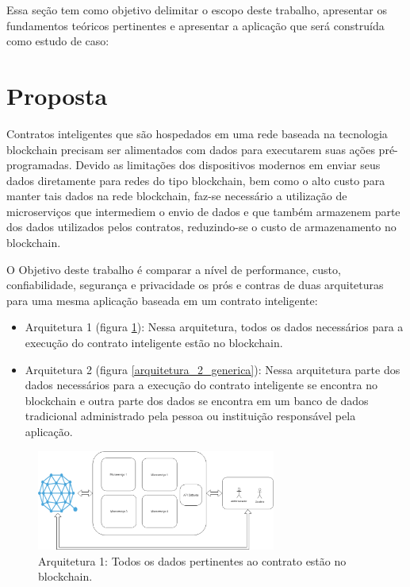 Essa seção tem como objetivo delimitar o escopo deste trabalho, apresentar os fundamentos teóricos pertinentes e apresentar a aplicação que será construída como estudo de caso:

\section{Proposta}

Contratos inteligentes que são hospedados em uma rede baseada na tecnologia blockchain precisam ser alimentados com dados para executarem suas ações pré-programadas. Devido as limitações dos dispositivos modernos em enviar seus dados diretamente para redes do tipo blockchain, bem como o alto custo para manter tais dados na rede blockchain, faz-se necessário a utilização de microserviços que intermediem o envio de dados e que também armazenem parte dos dados utilizados pelos contratos, reduzindo-se o custo de armazenamento no blockchain.

O Objetivo deste trabalho é comparar a nível de performance, custo, confiabilidade, segurança e privacidade os prós e contras de duas arquiteturas para uma mesma aplicação baseada em um contrato inteligente:

\begin{itemize}
\item Arquitetura 1 (figura \ref{arquitetura_1_generica}): Nessa arquitetura, todos os dados necessários para a execução do contrato inteligente estão no blockchain.
\item Arquitetura 2 (figura \ref{arquitetura_2_generica}): Nessa arquitetura parte dos dados necessários para a execução do contrato inteligente se encontra no blockchain e outra parte dos dados se encontra em um banco de dados tradicional administrado pela pessoa ou instituição responsável pela aplicação.
\end{itemize}

\begin{figure}[ht]
\centering
\includegraphics[width=0.7\textwidth]{Cap1/arquitetura_1_generica}
\caption{Arquitetura 1: Todos os dados pertinentes ao contrato estão no blockchain.}
\label{arquitetura_1_generica}
\end{figure}

